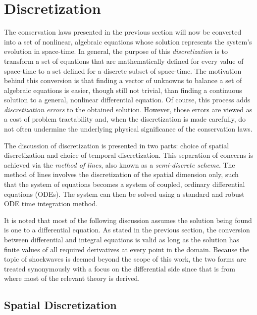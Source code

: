\documentclass[12pt]{../UWMadThesis}
\begin{document}
\chapter{Discretization}

The conservation laws presented in the previous section will now be converted into a set of nonlinear, algebraic equations whose solution represents the system's evolution in space-time.
In general, the purpose of this \textit{discretization} is to transform a set of equations that are mathematically defined for every value of space-time to a set defined for a discrete subset of space-time.
The motivation behind this conversion is that finding a vector of unknowns to balance a set of algebraic equations is easier, though still not trivial, than finding a continuous solution to a general, nonlinear differential equation.
Of course, this process adds \emph{discretization errors} to the obtained solution.
However, those errors are viewed as a cost of problem tractability and, when the discretization is made carefully, do not often undermine the underlying physical significance of the conservation laws.

The discussion of discretization is presented in two parts: choice of spatial discretization and choice of temporal discretization.
This separation of concerns is achieved via the \textit{method of lines}, also known as a \textit{semi-discrete scheme}.
The method of lines involves the discretization of the spatial dimension only, such that the system of equations becomes a system of coupled, ordinary differential equations (ODEs).
The system can then be solved using a standard and robust ODE time integration method.

It is noted that most of the following discussion assumes the solution being found is one to a differential equation.
As stated in the previous section, the conversion between differential and integral equations is valid as long as the solution has finite values of all required derivatives at every point in the domain.
Because the topic of shockwaves is deemed beyond the scope of this work, the two forms are treated synonymously with a focus on the differential side since that is from where most of the relevant theory is derived.


\section{Spatial Discretization}
\end{document}
